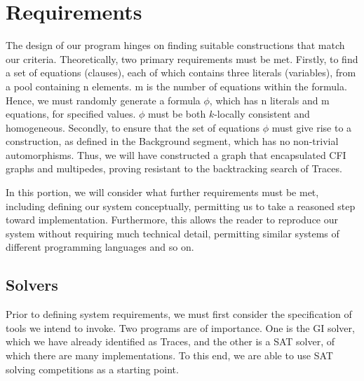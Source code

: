 \chapter{Requirements}

\ifpdf
    \graphicspath{{Chapter3/Figs/Raster/}{Chapter3/Figs/PDF/}{Chapter3/Figs/}}
\else
    \graphicspath{{Chapter3/Figs/Vector/}{Chapter3/Figs/}}
\fi
The design of our program hinges on finding suitable constructions that match our criteria. Theoretically, two primary requirements must be met. Firstly, to find a set of equations (clauses), each of which contains three literals (variables), from a pool containing n elements. m is the number of equations within the formula. Hence, we must randomly generate a formula $\phi$, which has n literals and m equations, for specified values. $\phi$ must be both $k$-locally consistent and homogeneous. Secondly, to ensure that the set of equations $\phi$ must give rise to a construction, as defined in the Background segment, which has no non-trivial automorphisms. Thus, we will have constructed a graph that encapsulated CFI graphs and multipedes, proving resistant to the backtracking search of Traces.
\par
In this portion, we will consider what further requirements must be met, including defining our system conceptually, permitting us to take a reasoned step toward implementation. Furthermore, this allows the reader to reproduce our system without requiring much technical detail, permitting similar systems of different programming languages and so on. 

\section{Solvers}
Prior to defining system requirements, we must first consider the specification of tools we intend to invoke. Two programs are of importance. One is the GI solver, which we have already identified as Traces, and the other is a SAT solver, of which there are many implementations. To this end, we are able to use SAT solving competitions as a starting point. 

